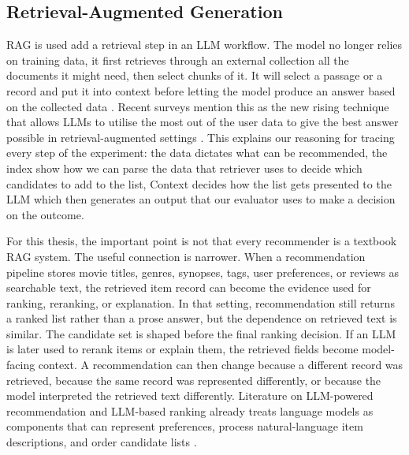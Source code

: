 \subsection{Retrieval-Augmented Generation}

RAG is used add a retrieval step in an LLM workflow. The model no longer relies on training data, it first retrieves through an external collection all the documents it might need, then select chunks of it. It will select a passage or a record and put it into context before letting the model produce an answer based on the collected data \cite{lewis2020rag}. Recent surveys mention this as the new rising technique that allows LLMs to utilise the most out of the user data to give the best answer possible in retrieval-augmented settings \cite{gao2024ragsurvey,huang2024ragsurvey}. This explains our reasoning for tracing every step of the experiment: the data dictates what can be recommended, the index show how we can parse the data that retriever uses to decide which candidates to add to the list, Context decides how the list gets presented to the LLM which then generates an output that our evaluator uses to make a decision on the outcome. 

For this thesis, the important point is not that every recommender is a textbook RAG system. The useful connection is narrower. When a recommendation pipeline stores movie titles, genres, synopses, tags, user preferences, or reviews as searchable text, the retrieved item record can become the evidence used for ranking, reranking, or explanation. In that setting, recommendation still returns a ranked list rather than a prose answer, but the dependence on retrieved text is similar. The candidate set is shaped before the final ranking decision. If an LLM is later used to rerank items or explain them, the retrieved fields become model-facing context. A recommendation can then change because a different record was retrieved, because the same record was represented differently, or because the model interpreted the retrieved text differently. Literature on LLM-powered recommendation and LLM-based ranking already treats language models as components that can represent preferences, process natural-language item descriptions, and order candidate lists \cite{wu2024llmrecsurvey,zhao2024llmrecsystems,hou2024llmrankers,sun2024rankgpt}.

